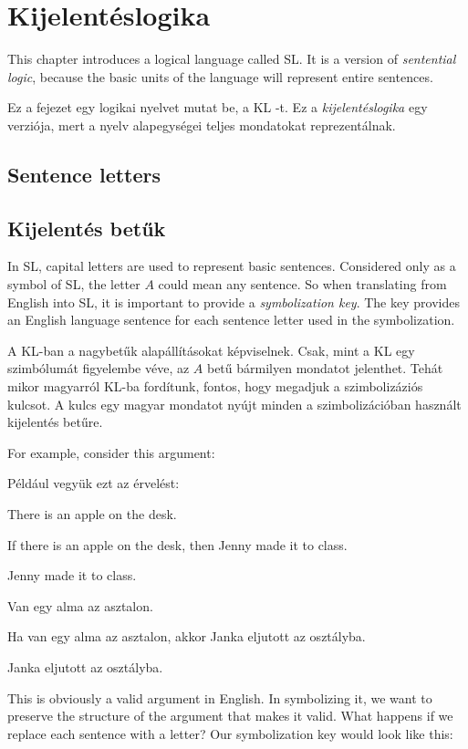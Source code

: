 
\chapter{Kijelentéslogika}
\label{ch.SL}


This chapter introduces a logical language called SL. It is a version of \emph{sentential logic}, because the basic units of the language will represent entire sentences.

Ez a fejezet egy logikai nyelvet mutat be, a KL -t. Ez a \emph{kijelentéslogika} egy verziója, mert a nyelv alapegységei teljes mondatokat reprezentálnak.


\section*{Sentence letters}

\section{Kijelentés betűk}
In SL, capital letters are used to represent basic sentences. Considered only as a symbol of SL, the letter $A$ could mean any sentence. So when translating from English into SL, it is important to provide a \emph{symbolization key}. The key provides an English language sentence for each sentence letter used in the symbolization.

A KL-ban a nagybetűk alapállításokat képviselnek. Csak, mint a KL egy szimbólumát figyelembe véve, az $A$ betű bármilyen mondatot jelenthet. Tehát mikor magyarról KL-ba fordítunk, fontos, hogy megadjuk a szimbolizáziós kulcsot. A kulcs egy magyar mondatot nyújt minden a szimbolizációban használt kijelentés betűre.

For example, consider this argument:

Például vegyük ezt az érvelést:
\begin{earg}
\item[] There is an apple on the desk.
\item[] If there is an apple on the desk, then Jenny made it to class.
\item[\therefore] Jenny made it to class.
\end{earg}

\begin{earg}
\item[] Van egy alma az asztalon.
\item[] Ha van egy alma az asztalon, akkor Janka eljutott az osztályba.
\item[\therefore] Janka eljutott az osztályba.
\end{earg}
This is obviously a valid argument in English. In symbolizing it, we want to preserve the structure of the argument that makes it valid.
What happens if we replace each sentence with a letter? Our symbolization key would look like this:

